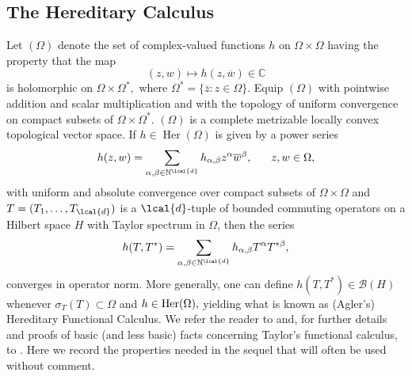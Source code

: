 \documentclass[a4paper,reqno,index]{amsart}
\numberwithin{equation}{section}
\newcommand{\specT}{\sigma_T}  %
\newcommand{\Her}{\operatorname{Her}}
\newcommand{\tOmega}{\Omega^*}
\theoremstyle{definition}
\begin{document}
 
 \subsection{The Hereditary Calculus}
 \label{s:her-calc}


Let  $(\Omega)$ denote the set of complex-valued functions $h$ on $\Omega\times\Omega$  having the property that the map
\[(z, w)\mapsto h(z, \overline{w})\in\mathbb{C} \]
is holomorphic on $\Omega\times\tOmega,$ where $ \tOmega=\{\overline{z}:z\in\Omega\}.$   Equip $(\Omega)$ with pointwise addition and scalar multiplication and with the topology of uniform convergence on compact subsets of $\Omega\times\Omega^*.$ $(\Omega)$ is a complete metrizable locally convex topological vector space. 
%
If $h\in \Her(\Omega)$ is given by a power series 
\[
   h(z, w)=\sum_{\alpha, \beta\in\mathbb{N}^{\lcal{d}}}h_{\alpha, \beta}z^{\alpha}\overline{w}^{\beta}, \hspace{0.6 cm} z, w\in\Omega,
\]
with uniform and absolute convergence over compact subsets of $\Omega\times\Omega$ 
 and  $T=(T_1, \dots, T_{\lcal{d}})$ is a $\lcal{d}$-tuple of bounded commuting operators on a Hilbert space $H$ with Taylor spectrum in $\Omega$, then  the series 
 \[
   h(T, T^*)=\sum_{\alpha, \beta\in\mathbb{N}^{\lcal{d}}}h_{\alpha,\beta} T^{\alpha}T^{*\beta},
\] 
 converges in operator norm. 
 {More generally, one can define $h(T, T^*)\in\mathcal{B}(H)$ whenever $\specT(T)\subset\Omega$ and $h\in\textup{Her}(\Omega),$  yielding what is known as (Agler’s) Hereditary Functional
Calculus.} We refer the reader to  
\cite[p. 290-291]{Polynomialarazyenglis} and, for further details and proofs of basic (and less basic) facts concerning Taylor's functional calculus, to \cite[Chapter IV - Section 30]{mullerbook}.  Here
we record the properties needed in the sequel that will often be used without comment.
\end{document}
